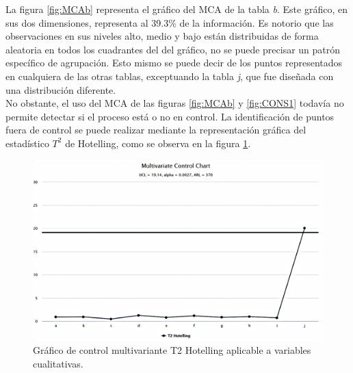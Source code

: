 \documentclass[water,article,submit,moreauthors,pdftex]{mdpi}
\begin{document}
La figura \ref{fig:MCAb} representa el gráfico del MCA de la tabla
\emph{b}. Este gráfico, en sus dos dimensiones, representa al 39.3\% de
la información. Es notorio que las observaciones en sus niveles alto,
medio y bajo están distribuidas de forma aleatoria en todos los
cuadrantes del del gráfico, no se puede precisar un patrón específico de
agrupación. Esto mismo se puede decir de los puntos representados en
cualquiera de las otras tablas, exceptuando la tabla \emph{j}, que fue
diseñada con una distribución diferente.\\
No obstante, el uso del MCA de las figuras \ref{fig:MCAb} y
\ref{fig:CONS1} todavía no permite detectar si el proceso está o no en
control. La identificación de puntos fuera de control se puede realizar
mediante la representación gráfica del estadístico \(T^2\) de Hotelling,
como se observa en la figura \ref{fig:hot1}.

\begin{figure}[!ht]



\begin{center}\includegraphics[width=0.9\linewidth,]{Hot1} \end{center}

\caption{Gráfico de control multivariante T2 Hotelling aplicable a variables cualitativas.}

\label{fig:hot1}
\end{figure}
\end{document}
